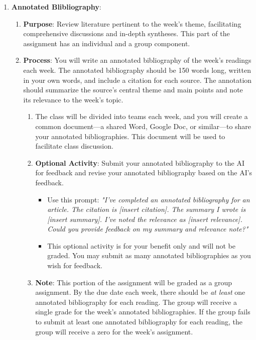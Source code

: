 \documentclass[12pt, letterpaper]{article}
\begin{document}
\begin{enumerate}

\item \textbf{Annotated Blibliography}: 

\begin{enumerate}
    \item \textbf{Purpose}: Review literature pertinent to the week's theme, facilitating comprehensive discussions and in-depth syntheses. This part of the assignment has an individual and a group component.
    \item \textbf{Process}: You will write an annotated bibliography of the week's readings each week. The annotated bibliography should be 150 words long, written in your own words, and include a citation for each source.  The annotation should summarize the source's central theme and main points and note its relevance to the week's topic.
    \begin{enumerate}
        \item The class will be divided into teams each week, and you will create a common document—a shared Word, Google Doc, or similar—to share your annotated bibliographies. This document will be used to facilitate class discussion.
        \item \textbf{Optional Activity}: Submit your annotated bibliography to the AI for feedback and revise your annotated bibliography based on the AI's feedback.
            \begin{itemize}
                \item Use this prompt: 
                \textit{"I've completed an annotated bibliography for an article. The citation is [insert citation]. The summary I wrote is [insert summary]. I've noted the relevance as [insert relevance]. Could you provide feedback on my summary and relevance note?"}
                \item This optional activity is for your benefit only and will not be graded. You may submit as many annotated bibliographies as you wish for feedback. 
            \end{itemize}
        \item \textbf{Note}: This portion of the assignment will be graded as a group assignment. By the due date each week, there should be \textit{at least} one annotated bibliography for each reading. The group will receive a single grade for the week's annotated bibliographies. If the group fails to submit at least one annotated bibliography for each reading, the group will receive a zero for the week's assignment.
    \end{enumerate}
\end{enumerate}


\end{enumerate}
\end{document}
